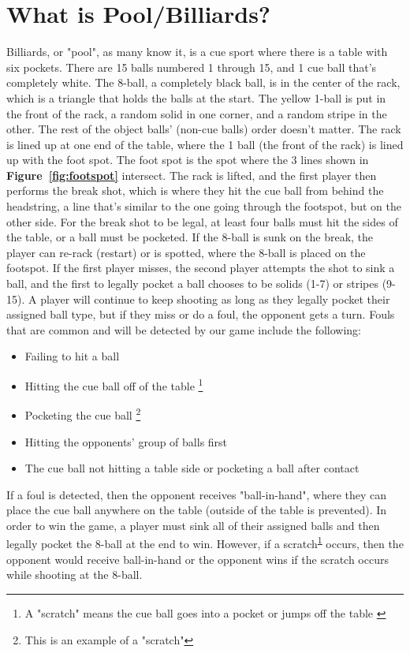 \documentclass[12pt]{article}
\begin{document}
\section{What is Pool/Billiards?} \label{sec:info}
Billiards, or "pool", as many know it, is a cue sport where there is a table with six pockets. There are 15 balls numbered 1 through 15, and 1 cue ball that's completely white. The 8-ball, a completely black ball, is in the center of the rack, which is a triangle that holds the balls at the start. The yellow 1-ball is put in the front of the rack, a random solid in one corner, and a random stripe in the other. The rest of the object balls' (non-cue balls) order doesn't matter. The rack is lined up at one end of the table, where the 1 ball (the front of the rack) is lined up with the foot spot. The foot spot is the spot where the 3 lines shown in \textbf{Figure~\ref{fig:footspot}} intersect. The rack is lifted, and the first player then performs the break shot, which is where they hit the cue ball from behind the headstring, a line that's similar to the one going through the footspot, but on the other side. For the break shot to be legal, at least four balls must hit the sides of the table, or a ball must be pocketed. If the 8-ball is sunk on the break, the player can re-rack (restart) or is spotted, where the 8-ball is placed on the footspot. If the first player misses, the second player attempts the shot to sink a ball, and the first to legally pocket a ball chooses to be solids (1-7) or stripes (9-15). A player will continue to keep shooting as long as they legally pocket their assigned ball type, but if they miss or do a foul, the opponent gets a turn. Fouls that are common and will be detected by our game include the following:

\begin{itemize}
    \item Failing to hit a ball
    \item Hitting the cue ball off of the table \protect\footnote{ A "scratch" means the cue ball goes into a pocket or jumps off the table \label{note:scratch}}
    \item Pocketing the cue ball \protect\footnote{ This is an example of a "scratch"}
    \item Hitting the opponents' group of balls first
    \item The cue ball not hitting a table side or pocketing a ball after contact
\end{itemize}
\space

If a foul is detected, then the opponent receives "ball-in-hand", where they can place the cue ball anywhere on the table (outside of the table is prevented). In order to win the game, a player must sink all of their assigned balls and then legally pocket the 8-ball at the end to win. However, if a scratch\textsuperscript{\ref{note:scratch}} occurs, then the opponent would receive ball-in-hand or the opponent wins if the scratch occurs while shooting at the 8-ball.
\end{document}
